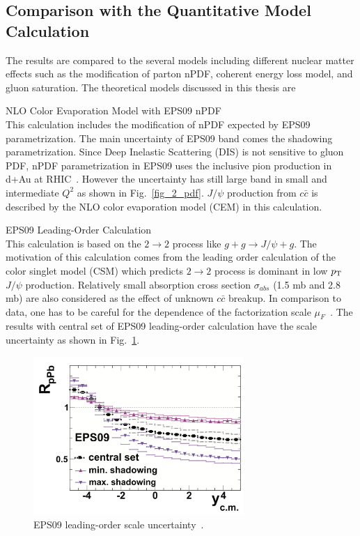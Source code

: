 \subsection{Comparison with the Quantitative Model Calculation}
The results are compared to the several models including different nuclear matter effects such as the modification of parton nPDF, coherent energy loss model, and gluon saturation. 
The theoretical models discussed in this thesis are 
\begin{description}
\item{NLO Color Evaporation Model with  EPS09 nPDF~\cite{bib_shadow}}  \\ \mbox{}
This calculation includes the modification of nPDF expected by EPS09 parametrization. 
The main uncertainty of EPS09 band comes the shadowing parametrization.
Since Deep Inelastic Scattering (DIS) is not sensitive to gluon PDF, nPDF parametrization in EPS09 uses the inclusive pion production in d+Au at RHIC~\cite{bib_daupion}. 
However the uncertainty has still large band in small and intermediate $Q^{2}$ as shown in Fig.~\ref{fig_2_pdf}.
$J/\psi$ production from $c\bar{c}$ is described by the NLO color evaporation model (CEM) in this calculation. 

\item{EPS09 Leading-Order Calculation~\cite{bib_shadowlo}} \\ \mbox{}
This calculation is based on the $2\rightarrow 2$ process like $g+g\rightarrow J/\psi + g$. 
The motivation of this calculation comes from the leading order calculation of the color singlet model (CSM) which predicts $2\rightarrow2$ process is dominant in low $p_{\rm{T}}$ $J/\psi$ production. 
Relatively small absorption cross section $\sigma_{abs}$ (1.5 mb and 2.8 mb) are also considered as the effect of unknown $c\bar{c}$ breakup. 
In comparison to data, one has to be careful for the dependence of the factorization scale $\mu_{F}$~\cite{bib_shadowlo}. 
The results with central set of EPS09 leading-order calculation have the scale uncertainty as shown in Fig.~\ref{fig_5_eps09louncertainty}.
\begin{figure}[!h]
  \centering
  \includegraphics[width=8cm]{chap5/figure/ModelComp/epslouncertainty.png}
  \caption{EPS09 leading-order scale uncertainty~\cite{bib_shadowlo}. }
  \label{fig_5_eps09louncertainty}
\end{figure}


\end{description}
